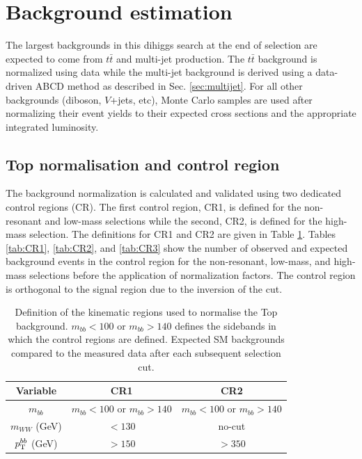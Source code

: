 \section{Background estimation}
\label{sec:bckg}
The largest backgrounds in this dihiggs search at the end of selection are expected to come from $t \bar{t}$ and multi-jet production. The $t\bar{t}$ background is normalized using data while the multi-jet background is derived using a data-driven ABCD method as described in Sec. \ref{sec:multijet}. For all other backgrounds (diboson, $V$+jets, etc), Monte Carlo samples are used after normalizing their event yields to their expected cross sections and the appropriate integrated luminosity.

\subsection{Top normalisation and control region}
\label{subsec:topCR}
The \ttbar background normalization is calculated and validated using two dedicated control regions (CR). The first control region, CR1, is defined for the non-resonant and low-mass selections while the second, CR2, is defined for the high-mass selection. The definitions for CR1 and CR2 are given in Table \ref{tab:CRdef}. Tables \ref{tab:CR1}, \ref{tab:CR2}, and \ref{tab:CR3} show the number of observed and expected background events in the \mbb control region for the non-resonant, low-mass, and high-mass selections before the application of \ttbar normalization factors. The \mbb control region is orthogonal to the signal region due to the inversion of the \mbb cut.
\begin{table}
\begin{center}
\begin{tabular}{|c|c|c|}
\hline
 Variable 						&CR1 				& CR2 \\
\hline					
$m_{bb}$						& $m_{bb} < 100$ or $m_{bb} > 140$ & $m_{bb} < 100$ or $m_{bb} > 140$\\
$m_{WW}$ (GeV)   				& $<130$ 		 		& no-cut \\
$p_{\rm T}^{bb}$ (GeV) 			& $>150$ 		 		&$>350$\\
\hline
\end{tabular}
\end{center}
\caption{Definition of the kinematic regions used to normalise the Top background. $m_{bb} < 100$ or $m_{bb} > 140$ defines the sidebands in which the control regions are defined. Expected SM backgrounds compared to the measured data after each subsequent selection cut.} 
\label{tab:CRdef}
\end{table}

